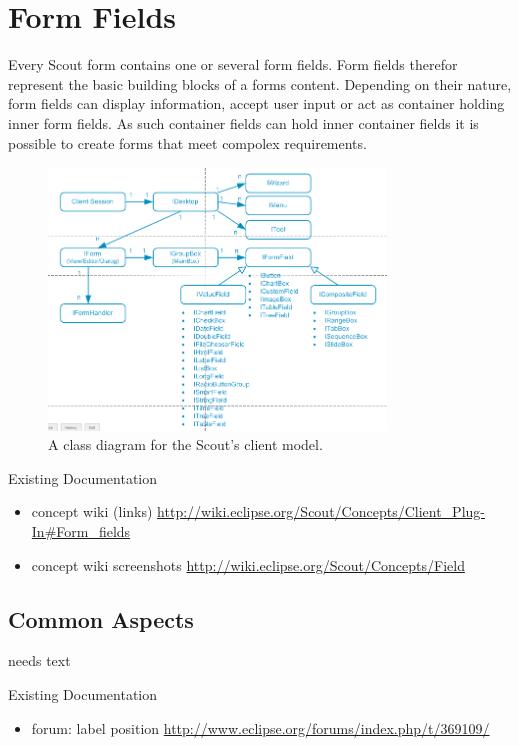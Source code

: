 \documentclass[a4paper,10pt,twoside]{book}
\begin{document}
\chapter{Form Fields}

Every Scout form contains one or several form fields.
Form fields therefor represent the basic building blocks of a forms content. 
Depending on their nature, form fields can display information, accept user input or act as container holding inner form fields.
As such container fields can hold inner container fields it is possible to create forms that meet compolex requirements.

\begin{figure}[!htb]
\centering
\includegraphics[width=0.8\textwidth]{scoutclientmodel.png}
\caption{A class diagram for the Scout's client model.}
\label{fig:scoutclientmodel}
\end{figure}



\noindent Existing Documentation
\begin{itemize}
  \item concept wiki (links) \url{http://wiki.eclipse.org/Scout/Concepts/Client_Plug-In#Form_fields}
  \item concept wiki screenshots \url{http://wiki.eclipse.org/Scout/Concepts/Field}
\end{itemize}

\section{Common Aspects}
needs text

\noindent Existing Documentation
\begin{itemize}
  \item forum: label position \url{http://www.eclipse.org/forums/index.php/t/369109/}
\end{itemize}
\end{document}
